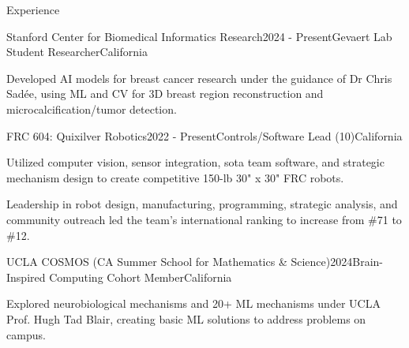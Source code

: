 \documentclass[
  11pt, %
]{resume}
\begin{document}
\sloppy


\begin{rSection}{Experience}


  \begin{rSubsection}{Stanford Center for Biomedical Informatics Research}{2024 - Present}{Gevaert Lab Student Researcher}{California}
    
    \item Developed AI models for breast cancer research under the guidance of Dr Chris Sadée, using ML and CV for 3D breast region reconstruction and microcalcification/tumor detection.
    
  \end{rSubsection}
        
  \begin{rSubsection}{FRC 604: Quixilver Robotics}{2022 - Present}{Controls/Software Lead (10)}{California}
    
    \item Utilized computer vision, sensor integration, sota team software, and strategic mechanism design to create competitive 150-lb 30" x 30" FRC robots.
    
    \item Leadership in robot design, manufacturing, programming, strategic analysis, and community outreach led the team's international ranking to increase from \#71 to \#12.
    
  \end{rSubsection}
        
  \begin{rSubsection}{UCLA COSMOS (CA Summer School for Mathematics \& Science)}{2024}{Brain-Inspired Computing Cohort Member}{California}
    
    \item Explored neurobiological mechanisms and 20+ ML mechanisms under UCLA Prof. Hugh Tad Blair, creating basic ML solutions to address problems on campus.
    
  \end{rSubsection}
        
	
\end{rSection}

\end{document}
